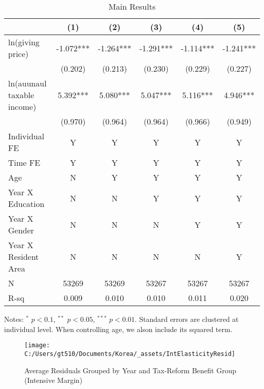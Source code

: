 \documentclass[ review  , 3p ]{elsarticle}
\begin{document}
  \begin{table}
  
  \caption{\label{tab:kableEstimateElasticityPart1}Main Results}
  \centering
  \fontsize{8}{10}\selectfont
  \begin{threeparttable}
  \begin{tabular}[t]{lccccc}
  \toprule
   & (1) & (2) & (3) & (4) & (5)\\
  \midrule
  ln(giving price) & -1.072*** & -1.264*** & -1.291*** & -1.114*** & -1.241***\\
   & (0.202) & (0.213) & (0.230) & (0.229) & (0.227)\\
  ln(auunaul taxable income) & 5.392*** & 5.080*** & 5.047*** & 5.116*** & 4.946***\\
   & (0.970) & (0.964) & (0.964) & (0.966) & (0.949)\\
  Individual FE & Y & Y & Y & Y & Y\\
  Time FE & Y & Y & Y & Y & Y\\
  Age & N & Y & Y & Y & Y\\
  Year X Education & N & N & Y & Y & Y\\
  Year X Gender & N & N & N & Y & Y\\
  Year X Resident Area & N & N & N & N & Y\\
  N & 53269 & 53269 & 53267 & 53267 & 53267\\
  R-sq & 0.009 & 0.010 & 0.010 & 0.011 & 0.020\\
  \bottomrule
  \end{tabular}
  \begin{tablenotes}
  \item Notes: $^{*}$ $p < 0.1$, $^{**}$ $p < 0.05$, $^{***}$ $p < 0.01$. Standard errors are clustered at individual level. When controlling age, we alson include its squared term.
  \end{tablenotes}
  \end{threeparttable}
  \end{table}
  
  \begin{figure}
  
  {\centering \texttt{[image: C:/Users/gt510/Documents/Korea/\_assets/IntElasticityResid]} 
  
  }
  
  \caption{Average Residuals Grouped by Year and Tax-Reform Benefit Group (Intensive Margin)}\label{fig:unnamed-chunk-3}
  \end{figure}
  
\end{document}
